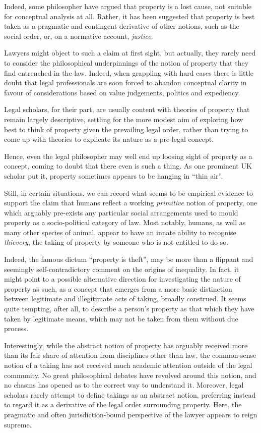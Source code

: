 Indeed, some philosopher have argued that property is a lost cause, not suitable for conceptual analysis at all. Rather, it has been suggested that property is best taken as a pragmatic and contingent derivative of other notions, such as the social order, or, on a normative account, {\it justice}. 

Lawyers might object to such a claim at first sight, but actually, they rarely need to consider the philosophical underpinnings of the notion of property that they find entrenched in the law. Indeed, when grappling with hard cases there is little doubt that legal professionals are soon forced to abandon conceptual clarity in favour of considerations based on value judgements, politics and expediency.

Legal scholars, for their part, are usually content with theories of property that remain largely descriptive, settling for the more modest aim of exploring how best to think of property given the prevailing legal order, rather than trying to come up with theories to explicate its nature as a pre-legal concept.

Hence, even the legal philosopher may well end up loosing sight of property as a concept, coming to doubt that there even is such a thing. As one prominent UK scholar put it, property sometimes appears to be hanging in ``thin air''.

Still, in certain situations, we can record what seems to be empirical evidence to support the claim that humans reflect a working {\it primitive} notion of property, one which arguably pre-exists any particular social arrangements used to mould property as a socio-political category of law. Most notably, humans, as well as many other species of animal, appear to have an innate ability to recognise {\it thievery}, the taking of property by someone who is not entitled to do so.

Indeed, the famous dictum ``property is theft'', may be more than a flippant and seemingly self-contradictory comment on the origins of inequality. In fact, it might point to a possible alternative direction for investigating the nature of property as such, as a concept that emerges from a more basic distinction between legitimate and illegitimate acts of taking, broadly construed. It seems quite tempting, after all, to describe a person's property as that which they have taken by legitimate means, which may not be taken from them without due process.

Interestingly, while the abstract notion of property has arguably received more than its fair share of attention from disciplines other than law, the common-sense notion of a taking has not received much academic attention outside of the legal community. No great philosophical debates have revolved around this notion, and no chasms has opened as to the correct way to understand it. Moreover, legal scholars rarely attempt to define takings as an abstract notion, preferring instead to regard it as a derivative of the legal order surrounding property. Here, the pragmatic and often jurisdiction-bound perspective of the lawyer appears to reign supreme.

